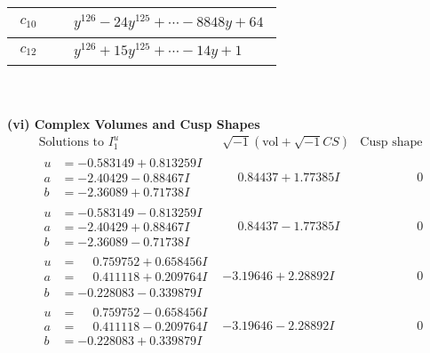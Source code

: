 \documentclass[1p]{elsarticle_modified}
\theoremstyle{definition}
\newcommand{\I}{\sqrt{-1}}
\begin{document}
\begin{tabular}{m{50pt}|m{274pt}}
\hline $$\begin{aligned}c_{10}\end{aligned}$$&$\begin{aligned}
&y^{126}-24 y^{125}+\cdots-8848 y+64
\end{aligned}$\\
\hline $$\begin{aligned}c_{12}\end{aligned}$$&$\begin{aligned}
&y^{126}+15 y^{125}+\cdots-14 y+1
\end{aligned}$\\
\hline
\end{tabular}\\~\\
\newpage\flushleft \textbf{(vi) Complex Volumes and Cusp Shapes}
$$\begin{array}{c|c|c}  
\text{Solutions to }I^u_{1}& \I (\text{vol} + \sqrt{-1}CS) & \text{Cusp shape}\\
 \hline 
\begin{aligned}
u &= -0.583149 + 0.813259 I \\
a &= -2.40429 - 0.88467 I \\
b &= -2.36089 + 0.71738 I\end{aligned}
 & \phantom{-}0.84437 + 1.77385 I & \phantom{-0.000000 } 0 \\ \hline\begin{aligned}
u &= -0.583149 - 0.813259 I \\
a &= -2.40429 + 0.88467 I \\
b &= -2.36089 - 0.71738 I\end{aligned}
 & \phantom{-}0.84437 - 1.77385 I & \phantom{-0.000000 } 0 \\ \hline\begin{aligned}
u &= \phantom{-}0.759752 + 0.658456 I \\
a &= \phantom{-}0.411118 + 0.209764 I \\
b &= -0.228083 - 0.339879 I\end{aligned}
 & -3.19646 + 2.28892 I & \phantom{-0.000000 } 0 \\ \hline\begin{aligned}
u &= \phantom{-}0.759752 - 0.658456 I \\
a &= \phantom{-}0.411118 - 0.209764 I \\
b &= -0.228083 + 0.339879 I\end{aligned}
 & -3.19646 - 2.28892 I & \phantom{-0.000000 } 0 \\ \hline\begin{aligned}

\end{aligned}
\end{array}$$
\end{document}
